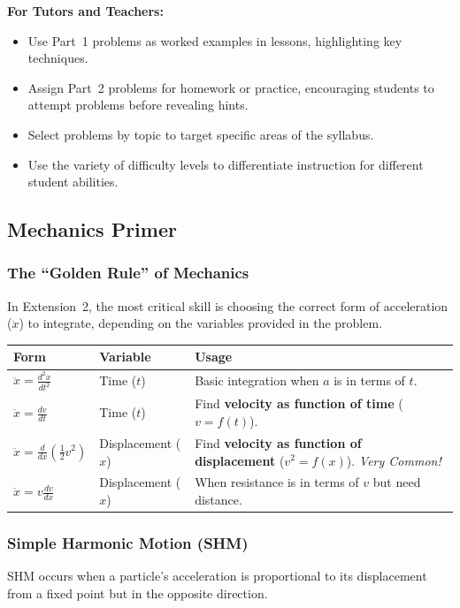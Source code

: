 \documentclass[12pt]{article}
\begin{document}
\textbf{For Tutors and Teachers:}
\begin{itemize}[leftmargin=*]
  \item Use Part~1 problems as worked examples in lessons, highlighting key techniques.
  \item Assign Part~2 problems for homework or practice, encouraging students to attempt problems before revealing hints.
  \item Select problems by topic to target specific areas of the syllabus.
  \item Use the variety of difficulty levels to differentiate instruction for different student abilities.
\end{itemize}

\subsection{Mechanics Primer}

\subsubsection*{The ``Golden Rule'' of Mechanics}
In Extension~2, the most critical skill is choosing the correct form of acceleration ($\ddot{x}$) to integrate, depending on the variables provided in the problem.

\begin{table}[h]
\centering
\renewcommand{\arraystretch}{1.5}
\begin{tabular}{@{}l l p{7cm}@{}}
\toprule
\textbf{Form} & \textbf{Variable} & \textbf{Usage} \\
\midrule
$\ddot{x} = \frac{d^2x}{dt^2}$ & Time ($t$) & Basic integration when $a$ is in terms of $t$. \\
$\ddot{x} = \frac{dv}{dt}$ & Time ($t$) & Find \textbf{velocity as function of time} ($v = f(t)$). \\
$\ddot{x} = \frac{d}{dx}\left(\frac{1}{2}v^2\right)$ & Displacement ($x$) & Find \textbf{velocity as function of displacement} ($v^2 = f(x)$). \textit{Very Common!} \\
$\ddot{x} = v\frac{dv}{dx}$ & Displacement ($x$) & When resistance is in terms of $v$ but need distance. \\
\bottomrule
\end{tabular}
\end{table}

\subsubsection*{Simple Harmonic Motion (SHM)}
SHM occurs when a particle's acceleration is proportional to its displacement from a fixed point but in the opposite direction.
\end{document}
